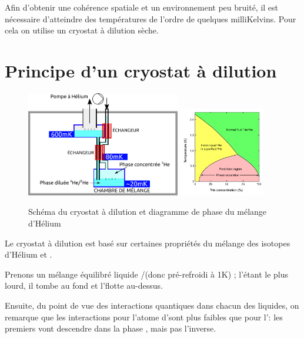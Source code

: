 Afin d'obtenir une cohérence spatiale et un environnement peu bruité, il est nécessaire d'atteindre des températures de l'ordre de quelques milliKelvins. Pour cela on utilise un cryostat à dilution sèche.
\section{Principe d'un cryostat à dilution}
\begin{figure}[h]
  \begin{center}
    \includegraphics[width=0.6\textwidth]{Images/Cryostat_Schema.pdf}
    \qquad
    \includegraphics[width=0.33\textwidth]{Images/Helium_phase_diagram.pdf}
    \caption{Schéma du cryostat à dilution et diagramme de phase du mélange d'Hélium}
  \end{center}
\end{figure}
Le cryostat à dilution est basé sur certaines propriétés du mélange des isotopes d'Hélium \HeT et \HeQ.
\newline

Prenons un mélange équilibré liquide \HeT/\HeQ(donc pré-refroidi à 1K) ; l'\HeQ étant le plus lourd, il tombe au fond et l'\HeT flotte au-dessus.

Ensuite, du point de vue des interactions quantiques dans chacun des liquides, on remarque que les interactions pour l'atome d'\HeT sont plus faibles que pour l'\HeQ : les premiers vont descendre dans la phase \HeQ, mais pas l'inverse.
\newline

